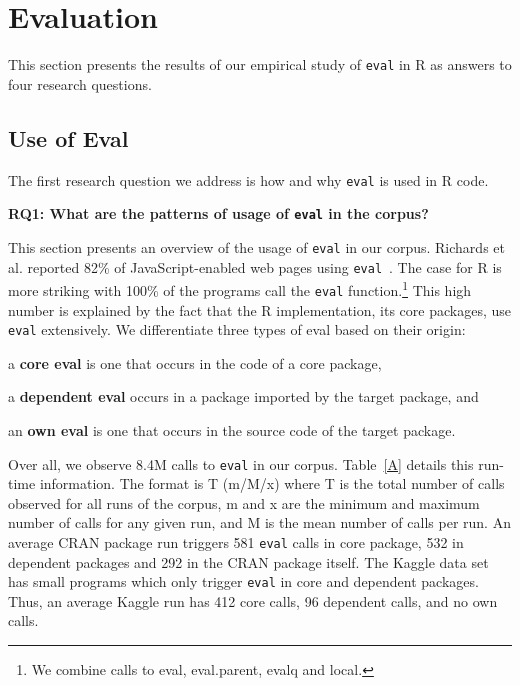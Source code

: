 \documentclass[a4paper,USenglish,cleveref, autoref, thm-restate]{lipics-v2019}
\newcommand{\AllAllCallCountRnd}{8.4M\xspace}
\newcommand{\eval}{\texttt{eval}\xspace}
\begin{document}
\section{Evaluation}

This section presents the results of our empirical study of \eval in R as
answers to four research questions.

\subsection{Use of Eval}

The first research question we address is how and why \eval is used in R code.

\begin{center}{\bfseries RQ1: What are the patterns of usage of \eval in the corpus?}\end{center}

This section presents an overview of the usage of \eval in our corpus. Richards
et al. reported 82\% of JavaScript-enabled web pages using \eval~\cite{ecoop11}.
The case for R is more striking with 100\% of the programs call the \eval
function.\footnote{We combine calls to {\sf eval}, {\sf eval.parent}, {\sf
    evalq} and {\sf local}.} This high number is explained by the fact that the
R implementation, its core packages, use \eval extensively. We differentiate
three types of eval based on their origin:
%
\begin{compactitem}[$-$]
  \item a {\bf core eval} is one that occurs in the code of a core package,
  \item a {\bf dependent eval} occurs in a package imported by the target
  package, and
  \item an {\bf own eval} is one that occurs in the source code of the target
  package.
\end{compactitem}

Over all, we observe \AllAllCallCountRnd calls to \eval in our corpus.
Table~\ref{A} details this run-time information. The format is T (m/M/x)
where T is the total number of calls observed for all runs of the corpus, m
and x are the minimum and maximum number of calls for any given run, and M
is the mean number of calls per run. An average CRAN package run triggers
581 {\eval} calls in core package, 532 in dependent packages and 292 in the
CRAN package itself.  The Kaggle data set has small programs which only
trigger \eval in core and dependent packages. Thus, an average Kaggle run
has 412 core calls, 96 dependent calls, and no own calls.
\end{document}
